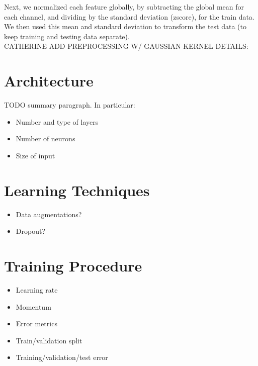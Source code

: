 \documentclass{article}
\begin{document}
Next, we normalized each feature globally, by subtracting the global mean for
each channel, and dividing by the standard deviation (zscore), for the train
data. We then used this mean and standard deviation to transform the test data
(to keep training and testing data separate). \\

CATHERINE ADD PREPROCESSING W/ GAUSSIAN KERNEL DETAILS:\\


\section{Architecture}

TODO summary paragraph. In particular:
\begin{itemize}
\item Number and type of layers
\item Number of neurons
\item Size of input
\end{itemize}

\section{Learning Techniques}
\begin{itemize}
\item Data augmentations?
\item Dropout?
\end{itemize}

\section{Training Procedure}
\begin{itemize}
\item Learning rate
\item Momentum
\item Error metrics
\item Train/validation split
\item Training/validation/test error
\end{itemize}
\end{document}

